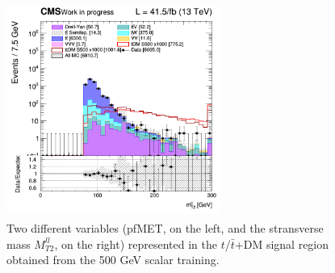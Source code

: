 \documentclass[a4paper, 10pt, openright]{report}
\begin{document}
\begin{figure}[htbp]
{\begin{minipage}[b]{.48\textwidth}
\end{minipage}\hfill
\begin{minipage}[b]{.48\textwidth}
\includegraphics[width=7cm, height=7cm]{figs/2017/SmearSR-ttDM-scalar500/log_cratio_ST_topCR_ll_BDT_ttDM500_mt2ll.png}
\end{minipage} \hfill
}
\caption{Two different variables (pf\ac{MET}, on the left, and the stransverse mass $M_{T2}^{ll}$, on the right) represented in the $t /\bar t$+DM signal region obtained from the 500 GeV scalar training.}
\label{fig:SR3}
\end{figure}
\end{document}
